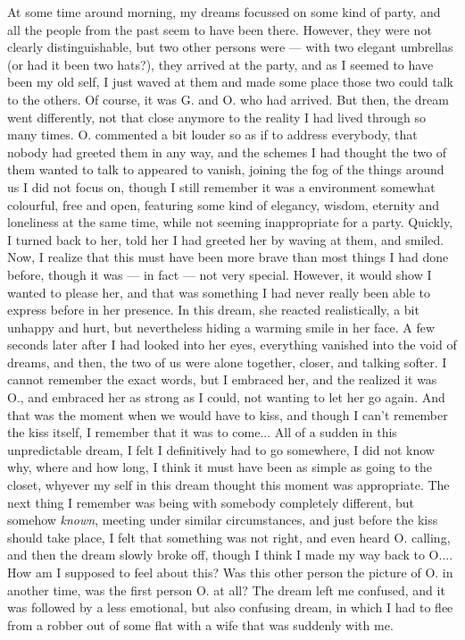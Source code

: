 At some time around morning, my dreams focussed on some kind of party, and all the people from the past seem to have been there. However, they were not clearly distinguishable, but two other persons were --- with two elegant umbrellas (or had it been two hats?), they arrived at the party, and as I seemed to have been my old self, I just waved at them and made some place those two could talk to the others. 
Of course, it was G. and O. who had arrived. But then, the dream went differently, not that close anymore to the reality I had lived through so many times. O. commented a bit louder so as if to address everybody, that nobody had greeted them in any way, and the schemes I had thought the two of them wanted to talk to appeared to vanish, joining the fog of the things around us I did not focus on, though I still remember it was a environment somewhat colourful, free and open, featuring some kind of elegancy, wisdom, eternity and loneliness at the same time, while not seeming inappropriate for a party. 
Quickly, I turned back to her, told her I had greeted her by waving at them, and smiled. Now, I realize that this must have been more brave than most things I had done before, though it was --- in fact --- not very special. However, it would show I wanted to please her, and that was something I had never really been able to express before in her presence. In this dream, she reacted realistically, a bit unhappy and hurt, but nevertheless hiding a warming smile in her face. 
A few seconds later after I had looked into her eyes, everything vanished into the void of dreams, and then, the two of us were alone together, closer, and talking softer. I cannot remember the exact words, but I embraced her, and the realized it was O., and embraced her as strong as I could, not wanting to let her go again. And that was the moment when we would have to kiss, and though I can't remember the kiss itself, I remember that it was to come... 
All of a sudden in this unpredictable dream, I felt I definitively had to go somewhere, I did not know why, where and how long, I think it must have been as simple as going to the closet, whyever my self in this dream thought this moment was appropriate. 
The next thing I remember was being with somebody completely different, but somehow \emph{known}, meeting under similar circumstances, and just before the kiss should take place, I felt that something was not right, and even heard O. calling, and then the dream slowly broke off, though I think I made my way back to O.... 
How am I supposed to feel about this? Was this other person the picture of O. in another time, was the first person O. at all? The dream left me confused, and it was followed by a less emotional, but also confusing dream, in which I had to flee from a robber out of some flat with a wife that was suddenly with me. 
